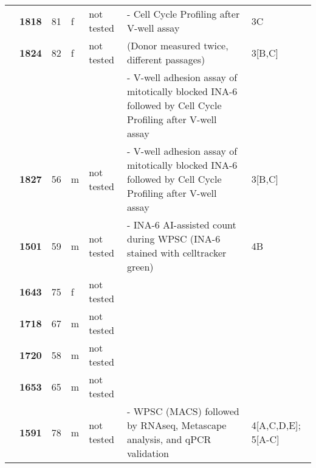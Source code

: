 {\begin{longtable}{|>{\bfseries}p{1.5cm}|>{\bfseries}p{1.2cm}|p{1cm}|p{1cm}|p{2.3cm}|p{6cm}|p{1.7cm}|}
        \hhline{~------}
                          & 1818  & 81 & f & not tested & - Cell Cycle Profiling after V-well assay                                                                & 3C                                      \\
        \hhline{~------}
                          & 1824  & 82 & f & not tested & (Donor measured twice, different passages)                                                               & 3[B,C]                                  \\
                          &       &    &   &            & - V-well adhesion assay of mitotically blocked INA-6 followed by Cell Cycle Profiling after V-well assay &                                         \\
        \hhline{~----~~}
                          & 1827  & 56 & m & not tested & - V-well adhesion assay of mitotically blocked INA-6 followed by Cell Cycle Profiling after V-well assay & 3[B,C]                                  \\
        \hhline{~------}
                          & 1501  & 59 & m & not tested & - INA-6 AI-assisted count during WPSC (INA-6 stained with celltracker green)                             & 4B                                      \\
        \hhline{~----~~}
                          & 1643  & 75 & f & not tested &                                                                                                          &                                         \\
        \hhline{~----~~}
                          & 1718  & 67 & m & not tested &                                                                                                          &                                         \\
        \hhline{~----~~}
                          & 1720  & 58 & m & not tested &                                                                                                          &                                         \\
        \hhline{~----~~}
                          & 1653  & 65 & m & not tested &                                                                                                          &                                         \\
        \hhline{~------}
                          & 1591  & 78 & m & not tested & - WPSC (MACS) followed by RNAseq, Metascape analysis, and qPCR validation                                & 4[A,C,D,E]; 5[A-C]                      \\

\end{longtable}}
